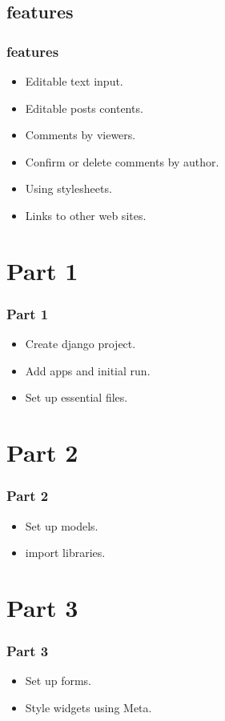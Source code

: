 \documentclass{beamer}
\begin{document}
\subsection{features}
\begin{frame}
	\frametitle{features}
	\begin{itemize}
		\item Editable text input.
		\item Editable posts contents.
		\item Comments by viewers.
		\item Confirm or delete comments by author.
		\item Using stylesheets.
		\item Links to other web sites.
	\end{itemize}
\end{frame}

\section{Part 1}
\begin{frame}
	\frametitle{Part 1}
	\begin{itemize}
		\item Create django project.
		\item Add apps and initial run.
		\item Set up essential files.
	\end{itemize}
\end{frame}

\section{Part 2}
\begin{frame}
	\frametitle{Part 2}
	\begin{itemize}
		\item Set up models.
		\item import libraries.
		
	\end{itemize}
\end{frame}

\section{Part 3}
\begin{frame}
	\frametitle{Part 3}
	\begin{itemize}
		\item Set up forms.
		\item Style widgets using Meta.
		
	\end{itemize}
\end{frame}
\end{document}
